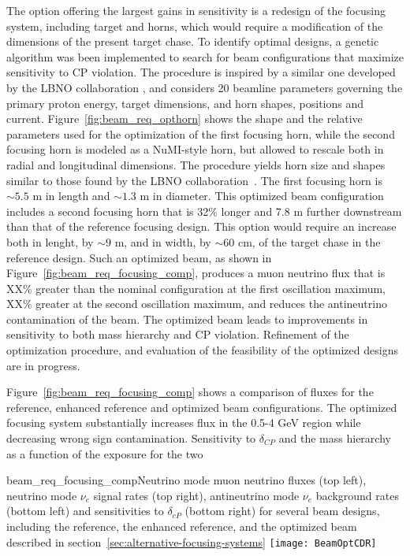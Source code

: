 The option offering the largest gains in sensitivity is a redesign of the focusing system, including target and horns, which would require a modification of the dimensions 
of the present target chase.  To identify optimal designs, a genetic algorithm was been implemented to search for beam configurations that maximize sensitivity to CP violation. 
The procedure is inspired by a similar one developed by the LBNO collaboration , and considers 20 beamline parameters governing the primary proton energy, target dimensions, 
and horn shapes, positions and current. Figure~\ref{fig:beam_req_opthorn} shows the shape and the relative parameters used for the optimization of the first focusing horn, 
while the second focusing horn is modeled as a NuMI-style horn, but allowed to rescale both in radial and longitudinal dimensions. The procedure yields horn size and shapes 
similar to those found by the LBNO collaboration~\cite{LBNO}. The first focusing horn is $\sim 5.5$ m in length and $\sim 1.3$ m in diameter. This 
optimized beam configuration includes a second focusing horn that is 32\% longer and 7.8 m further downstream than that of the reference focusing design.  This option would 
require an increase both in lenght, by $\sim 9$ m, and in width, by 
$\sim 60$ cm, of the target chase in the reference design.  Such an optimized beam, as shown in 
Figure~\ref{fig:beam_req_focusing_comp}, produces a muon neutrino flux that is XX\% greater than the nominal configuration at the first oscillation maximum, 
XX\% greater at the second oscillation maximum, and reduces the antineutrino contamination of the beam. The optimized beam leads to improvements in sensitivity to both mass hierarchy 
and CP violation. Refinement of the optimization procedure, and evaluation of the feasibility of the optimized designs are in progress. 

Figure~\ref{fig:beam_req_focusing_comp} shows a comparison of fluxes 
for the reference, enhanced reference and optimized beam configurations.  The optimized focusing system substantially 
increases flux in the 0.5-4 GeV region while decreasing wrong sign 
contamination.  Sensitivity to $\delta_{CP}$ and the mass hierarchy as 
a function of the exposure for the two 

\begin{cdrfigure}
{beam_req_focusing_comp}{Neutrino mode muon 
    neutrino fluxes (top left), neutrino mode $\nu_e$ signal rates 
    (top right), antineutrino mode $\nu_e$ background rates (bottom left) and 
    sensitivities to $\delta_{cP}$ (bottom right) for several beam designs, including the 
    reference, the enhanced reference, and the optimized beam described in section~\ref{sec:alternative-focusing-systems}}
  \texttt{[image: BeamOptCDR]}
\end{cdrfigure}

